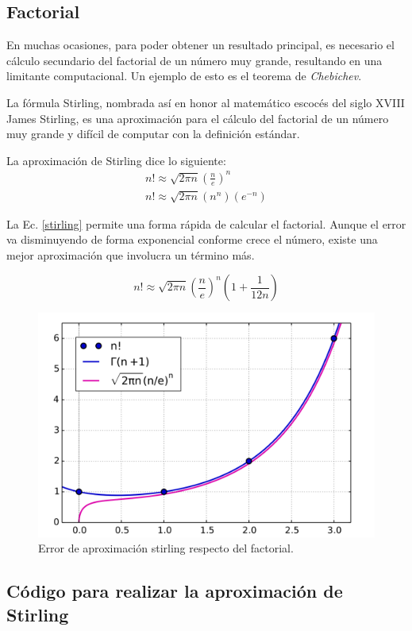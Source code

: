 \newpage
\subsection{Factorial}
En muchas ocasiones, para poder obtener un resultado principal, es necesario el
c\'alculo secundario del factorial de un n\'umero muy grande, resultando en una
limitante computacional. Un ejemplo de esto es el teorema de \textit{Chebichev}.

La f\'ormula Stirling, nombrada así en honor al matem\'atico escoc\'es del siglo
XVIII James Stirling, es una aproximaci\'on para el c\'alculo del factorial de
un n\'umero muy grande y dif\'icil de computar con la definici\'on est\'andar.

La aproximaci\'on de Stirling dice lo siguiente:
\begin{eqnarray}
	n!\approx \sqrt{2\pi n}(\frac{n}{e})^n\\
	n!\approx \sqrt{2\pi n} (n^n)(e^{-n})
	\label{stirling}
\end{eqnarray}

La Ec. \eqref{stirling} permite una forma r\'apida de calcular el factorial.
Aunque el error va disminuyendo de forma exponencial conforme crece el n\'umero,
existe una mejor aproximaci\'on que involucra un t\'ermino m\'as.


\begin{equation}
	n!\approx \sqrt{2\pi n}(\frac{n}{e})^n(1+\frac{1}{12n})
	\label{Stirling}
\end{equation}
\begin{figure}[h!]
	\centering
\includegraphics[scale=0.30]{figures/factorial_gamma_stirling.png}
\caption{Error de aproximaci\'on stirling respecto del factorial.}
\label{stirling_error}
\end{figure}

\pagebreak
\subsection{Código para realizar la aproximación de Stirling}


